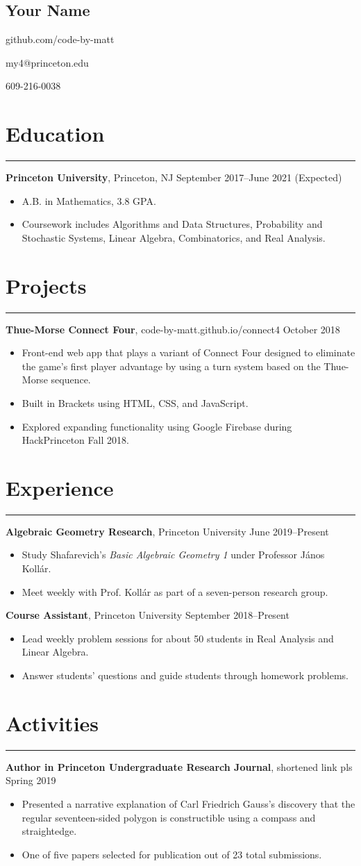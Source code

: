 \documentclass[11pt]{article}
\newcommand{\name}[1]{\begin{center}\section*{\huge #1}\end{center}}
\newcommand{\topinfo}[1]{\begin{center}\vspace{-0.2cm}#1\vspace{-0.2cm}\end{center}}
\newcommand{\resumesection}[1]{\vspace{-0.2cm}\section*{#1}\vspace{-0.2cm}\hrule\vspace{0.2cm}}
\begin{document}
\name{Your Name}
\topinfo{github.com/code-by-matt}
\topinfo{my4@princeton.edu}
\topinfo{609-216-0038}

\resumesection{Education}

\textbf{Princeton University}, Princeton, NJ \hfill September 2017--June 2021 (Expected)
\begin{itemize}
	\item A.B. in Mathematics, 3.8 GPA.
	\item Coursework includes Algorithms and Data Structures, Probability and Stochastic Systems, Linear Algebra, Combinatorics, and Real Analysis.
\end{itemize}

\resumesection{Projects}

\textbf{Thue-Morse Connect Four}, code-by-matt.github.io/connect4 \hfill October 2018
\begin{itemize}
	\item Front-end web app that plays a variant of Connect Four designed to eliminate the game's first player advantage by using a turn system based on the Thue-Morse sequence.
	\item Built in Brackets using HTML, CSS, and JavaScript.
	\item Explored expanding functionality using Google Firebase during HackPrinceton Fall 2018.
\end{itemize}

\resumesection{Experience}

\textbf{Algebraic Geometry Research}, Princeton University \hfill June 2019--Present
\begin{itemize}
	\item Study Shafarevich's \textit{Basic Algebraic Geometry 1} under Professor J\'{a}nos Koll\'{a}r.
	\item Meet weekly with Prof. Koll\'{a}r as part of a seven-person research group.
\end{itemize}

\textbf{Course Assistant}, Princeton University \hfill September 2018--Present
\begin{itemize}
	\item Lead weekly problem sessions for about 50 students in Real Analysis and Linear Algebra.
	\item Answer students' questions and guide students through homework problems.
\end{itemize}

\resumesection{Activities}

\textbf{Author in Princeton Undergraduate Research Journal}, shortened link pls \hfill Spring 2019
\begin{itemize}
	\item Presented a narrative explanation of Carl Friedrich Gauss's discovery that the regular seventeen-sided polygon is constructible using a compass and straightedge.
	\item One of five papers selected for publication out of 23 total submissions.
\end{itemize}
\end{document}
